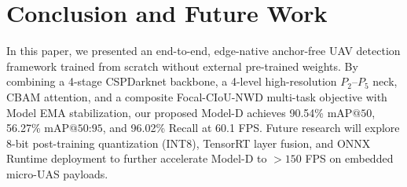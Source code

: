 \documentclass[conference]{IEEEtran}
\begin{document}
\section{Conclusion and Future Work}

In this paper, we presented an end-to-end, edge-native anchor-free UAV detection framework trained from scratch without external pre-trained weights. By combining a 4-stage CSPDarknet backbone, a 4-level high-resolution $P_2$--$P_5$ neck, CBAM attention, and a composite Focal-CIoU-NWD multi-task objective with Model EMA stabilization, our proposed Model-D achieves 90.54\% $\text{mAP@50}$, 56.27\% $\text{mAP@50:95}$, and 96.02\% Recall at 60.1 FPS. Future research will explore 8-bit post-training quantization (INT8), TensorRT layer fusion, and ONNX Runtime deployment to further accelerate Model-D to $>150$ FPS on embedded micro-UAS payloads.
\end{document}
